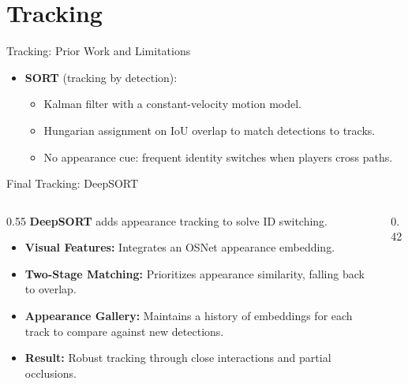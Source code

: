 \section{Tracking}
\label{sec:tracking}
\begin{frame}{Tracking: Prior Work and Limitations}
\begin{itemize}
  \item \textbf{SORT} \cite{sort} (tracking by detection): 
  \begin{itemize}
    \item Kalman filter with a constant-velocity motion model.
    \item Hungarian assignment on IoU overlap to match detections to tracks.
    \item No appearance cue: frequent identity switches when players cross paths.
  \end{itemize}
\end{itemize}
\end{frame}

\begin{frame}{Final Tracking: DeepSORT}
\begin{columns}[T]
  \begin{column}{0.55\textwidth}
    \textbf{DeepSORT} \cite{deepsort} adds appearance tracking to solve ID switching.
    \begin{itemize}
      \item \textbf{Visual Features:} Integrates an OSNet \cite{reid} appearance embedding.
      \item \textbf{Two-Stage Matching:} Prioritizes appearance similarity, falling back to overlap.
      \item \textbf{Appearance Gallery:} Maintains a history of embeddings for each track to compare against new detections.
      \item \textbf{Result:} Robust tracking through close interactions and partial occlusions.
    \end{itemize}
  \end{column}
  \begin{column}{0.42\textwidth}
    \videobox
  \end{column}
\end{columns}
\end{frame}



